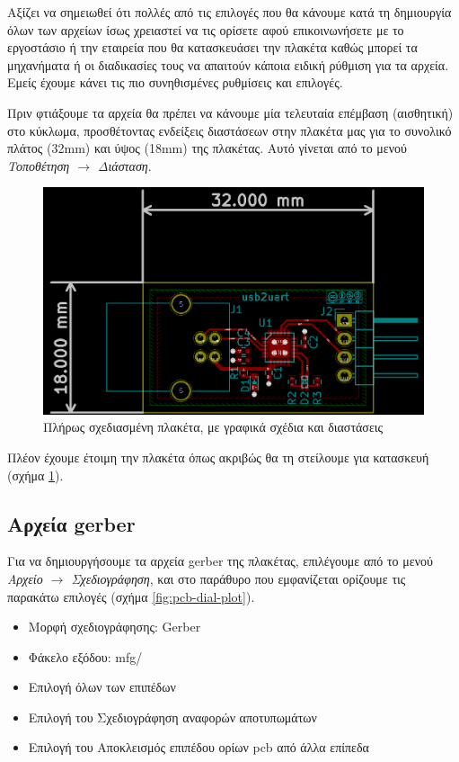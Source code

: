 \documentclass[a4paper]{article}
\begin{document}
Αξίζει να σημειωθεί ότι πολλές από τις επιλογές που θα κάνουμε κατά τη δημιουργία όλων των αρχείων ίσως χρειαστεί να τις ορίσετε αφού επικοινωνήσετε με το εργοστάσιο ή την εταιρεία που θα κατασκευάσει την πλακέτα καθώς μπορεί τα μηχανήματα ή οι διαδικασίες τους να απαιτούν κάποια ειδική ρύθμιση για τα αρχεία. Εμείς έχουμε κάνει τις πιο συνηθισμένες ρυθμίσεις και επιλογές.

Πριν φτιάξουμε τα αρχεία θα πρέπει να κάνουμε μία τελευταία επέμβαση (αισθητική) στο κύκλωμα, προσθέτοντας ενδείξεις διαστάσεων στην πλακέτα μας για το συνολικό πλάτος (32mm) και ύψος (18mm) της πλακέτας. Αυτό γίνεται από το μενού \textit{Τοποθέτηση $\rightarrow$ Διάσταση}.

\begin{figure}
  \begin{center}
    \includegraphics[width=.9\textwidth]{img/pcb-circ-finaldrwn.png}
    \caption{Πλήρως σχεδιασμένη πλακέτα, με γραφικά σχέδια και διαστάσεις}
    \label{fig:pcb-circ-finaldrwn}
  \end{center}
\end{figure}

Πλέον έχουμε έτοιμη την πλακέτα όπως ακριβώς θα τη στείλουμε για κατασκευή (σχήμα \ref{fig:pcb-circ-finaldrwn}).


\subsection{Αρχεία gerber}
Για να δημιουργήσουμε τα αρχεία gerber της πλακέτας, επιλέγουμε από το μενού \textit{Αρχείο $\rightarrow$ Σχεδιογράφηση}, και στο παράθυρο που εμφανίζεται ορίζουμε τις παρακάτω επιλογές (σχήμα \ref{fig:pcb-dial-plot}).

\begin{itemize}
    \item Μορφή σχεδιογράφησης: Gerber
    \item Φάκελο εξόδου: mfg/
    \item Επιλογή όλων των επιπέδων
    \item Επιλογή του Σχεδιογράφηση αναφορών αποτυπωμάτων
    \item Επιλογή του Αποκλεισμός επιπέδου ορίων pcb από άλλα επίπεδα
\end{itemize}
\end{document}
